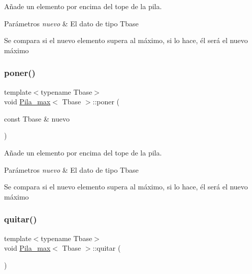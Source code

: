 Añade un elemento por encima del tope de la pila. 


\begin{DoxyParams}{Parámetros}
{\em nuevo} & El dato de tipo Tbase\\
\hline
\end{DoxyParams}
Se compara si el nuevo elemento supera al máximo, si lo hace, él será el nuevo máximo \mbox{\label{classPila__max_a08e06bab9c6269a0906b6ff47a533088}} 
\subsubsection{\texorpdfstring{poner()}{poner()}\hspace{0.1cm}{\footnotesize\ttfamily [2/2]}}
{\footnotesize\ttfamily template$<$typename Tbase$>$ \\
void \hyperlink{classPila__max}{Pila\+\_\+max}$<$ Tbase $>$\+::poner (\begin{DoxyParamCaption}\item[{const Tbase \&}]{nuevo }\end{DoxyParamCaption})}



Añade un elemento por encima del tope de la pila. 


\begin{DoxyParams}{Parámetros}
{\em nuevo} & El dato de tipo Tbase\\
\hline
\end{DoxyParams}
Se compara si el nuevo elemento supera al máximo, si lo hace, él será el nuevo máximo \mbox{\label{classPila__max_a362d8228e46eff38e2d5827a4726b9e9}} 
\subsubsection{\texorpdfstring{quitar()}{quitar()}\hspace{0.1cm}{\footnotesize\ttfamily [1/2]}}
{\footnotesize\ttfamily template$<$typename Tbase$>$ \\
void \hyperlink{classPila__max}{Pila\+\_\+max}$<$ Tbase $>$\+::quitar (\begin{DoxyParamCaption}{ }\end{DoxyParamCaption})}



